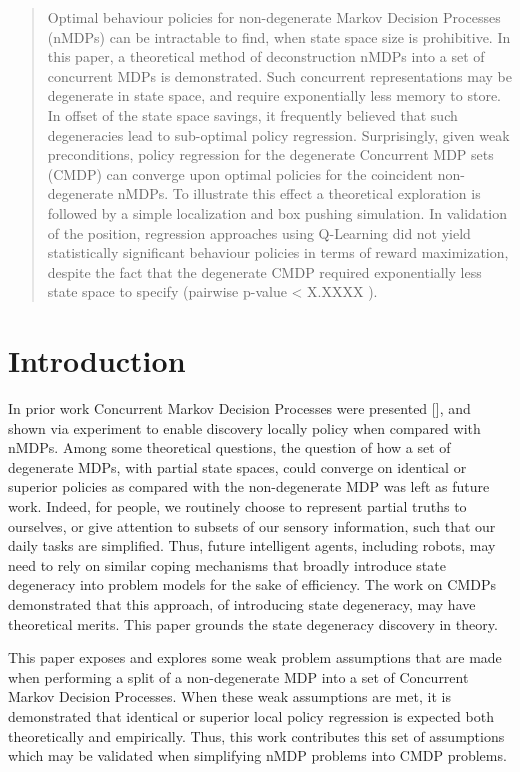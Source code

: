 \documentclass[compsoc,journal,letterpaper,10pt,draftclsnofoot,onecolumn]{IEEEtran}
\date{\today}
\begin{document}
\begin{abstract}
Optimal behaviour policies for non-degenerate Markov Decision Processes
(nMDPs) can be intractable to find, when state space size is
prohibitive. In this paper, a theoretical method of deconstruction nMDPs
into a set of concurrent MDPs is demonstrated. Such concurrent
representations may be degenerate in state space, and require
exponentially less memory to store. In offset of the state space
savings, it frequently believed that such degeneracies lead to
sub-optimal policy regression. Surprisingly, given weak preconditions,
policy regression for the degenerate Concurrent MDP sets (CMDP) can
converge upon optimal policies for the coincident non-degenerate nMDPs.
To illustrate this effect a theoretical exploration is followed by a
simple localization and box pushing simulation. In validation of the
position, regression approaches using Q-Learning did not yield
statistically significant behaviour policies in terms of reward
maximization, despite the fact that the degenerate CMDP required
exponentially less state space to specify (pairwise p-value \textless{}
X.XXXX ).
\end{abstract}

\section{Introduction}\label{introduction}

In prior work Concurrent Markov Decision Processes were presented
{[}{]}, and shown via experiment to enable discovery locally policy when
compared with nMDPs. Among some theoretical questions, the question of
how a set of degenerate MDPs, with partial state spaces, could converge
on identical or superior policies as compared with the non-degenerate
MDP was left as future work. Indeed, for people, we routinely choose to
represent partial truths to ourselves, or give attention to subsets of
our sensory information, such that our daily tasks are simplified. Thus,
future intelligent agents, including robots, may need to rely on similar
coping mechanisms that broadly introduce state degeneracy into problem
models for the sake of efficiency. The work on CMDPs demonstrated that
this approach, of introducing state degeneracy, may have theoretical
merits. This paper grounds the state degeneracy discovery in theory.

This paper exposes and explores some weak problem assumptions that are
made when performing a split of a non-degenerate MDP into a set of
Concurrent Markov Decision Processes. When these weak assumptions are
met, it is demonstrated that identical or superior local policy
regression is expected both theoretically and empirically. Thus, this
work contributes this set of assumptions which may be validated when
simplifying nMDP problems into CMDP problems.
\end{document}
